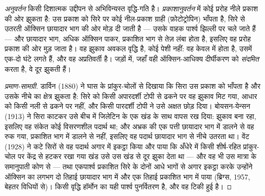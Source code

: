 \begin{proposition}[प्रकाशानुवर्तन]\label{prop:b2:plant-plasticity:phototropism}
\emph{अनुवर्तन} किसी दिशात्मक उद्दीपन से अभिविन्यस्त वृद्धि-गति है।
\emph{प्रकाशानुवर्तन} में कोई प्ररोह नीले प्रकाश की ओर झुकता है:
उस प्रकाश को सिरे पर कोई नील-प्रकाश ग्राही
(फ़ोटोट्रोपिन) भाँपता है, सिरे से उतरती ऑक्सिन छायादार भाग की ओर मोड़ दी
जाती है --- उसके वाहक पार्श्व झिल्ली पर चले जाते हैं ---
और छायादार भाग, अधिक ऑक्सिन पाकर, प्रकाशित भाग से तेज़ लंबा होता है,
इसलिए वह प्ररोह प्रकाश की ओर मुड़ जाता है। वह
झुकाव अवकल वृद्धि है, कोई पेशी नहीं: वह केवल
 में होता है, उसमें एक-दो घंटे लगते हैं, और वह अप्रतिवर्ती है।
जड़ों में, जहाँ वही ऑक्सिन-आधिक्य दीर्घीकरण को \emph{संदमित} करता है, वे
दूर झुकती हैं।
\end{proposition}
\begin{proof}[प्रमाण-सामग्री]
डार्विन (1880) ने घास के प्रांकुर-चोलों से दिखाया कि सिरा उस
प्रकाश को भाँपता है और उसके नीचे का क्षेत्र झुकता है:
सिरे को किसी अपारदर्शी टोपी से ढकने पर वह झुकाव मिट गया, आधार को किसी
नली से ढकने पर नहीं, और किसी पारदर्शी टोपी ने उसे अक्षत छोड़ दिया।
बोयसन-येन्सन (1913) ने सिरा काटकर उसे बीच में जिलेटिन के एक खंड के साथ
वापस रख दिया: झुकाव बना रहा, इसलिए वह संकेत कोई विसरणशील पदार्थ था; और
अभ्रक की एक पत्ती छायादार भाग में डालने से वह रुक गया, प्रकाशित भाग में
डालने से नहीं, इसलिए वह पदार्थ छायादार भाग से नीचे उतरता था। वेंट (1928)
ने कटे सिरों से वह पदार्थ अगार में इकट्ठा किया और पाया कि अँधेरे में
किसी शीर्ष-रहित प्रांकुर-चोल पर केंद्र से हटकर रखा गया खंड उसे उस खंड से
दूर झुका देता था --- और वह भी उस मात्रा के समानुपाती कोण से ---
तथा एकपार्श्व प्रकाशित सिरे के दोनों आधे भागों से अगार इकट्ठा करके
उन्होंने ऑक्सिन का लगभग दो तिहाई छायादार भाग में और एक तिहाई
प्रकाशित भाग में पाया (ब्रिग्स, 1957, बेहतर विधियों से)। किसी वृद्धि
हॉर्मोन का यही पार्श्व पुनर्वितरण  है, और वह टिकी हुई है।
\end{proof}

